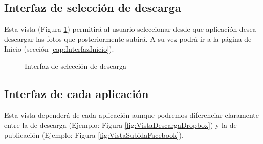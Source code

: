 \documentclass{scrartcl}
\begin{document}
\subsection{Interfaz de selección de descarga}
Esta vista (Figura \ref{fig:VistaSubida}) permitirá al usuario seleccionar desde que aplicación desea descargar las fotos que posteriormente subirá. A su vez podrá ir a la página de Inicio (sección \ref{cap:InterfazInicio}).
\begin{figure}[H]
	
	\centering
	\caption{Interfaz de selección de descarga}
	\label{fig:VistaSubida}
	
\end{figure}
\subsection{Interfaz de cada aplicación}
Esta vista dependerá de cada aplicación aunque podremos diferenciar claramente entre la de descarga (Ejemplo: Figura \ref{fig:VistaDescargaDropbox}) y la de publicación (Ejemplo: Figura \ref{fig:VistaSubidaFacebook}).
\end{document}
